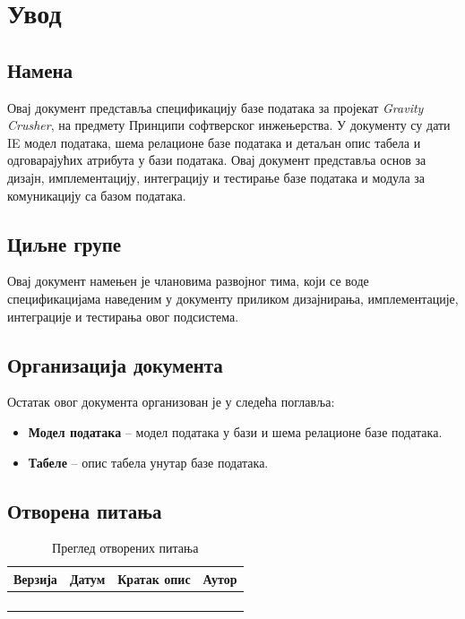 \section{Увод}

\subsection{Намена}
Овај документ представља спецификацију базе података за пројекат \textit{Gravity
Crusher}, на предмету Принципи софтверског инжењерства. У документу су дати IE модел
података, шема релационе базе података и детаљан опис табела и одговарајућих атрибута у
бази података. Овај документ представља основ за дизајн, имплементацију, интеграцију и
тестирање базе података и модула за комуникацију са базом података.

\subsection{Циљне групе}
Овај документ намењен је члановима развојног тима, који се воде спецификацијама наведеним
у документу приликом дизајнирања, имплементације, интеграције и тестирања овог
подсистема.

\subsection{Организација документа}
Остатак овог документа организован је у следећа поглавља:
    \begin{itemize}
        \item \textbf{Модел података} -- модел података у бази и шема релационе базе
                     података.
        \item \textbf{Табеле} -- опис табела унутар базе података.
    \end{itemize}

\subsection{Отворена питања}

\begin{table}[h!]
\centering

    \begin{tabu}{ || X[l] | X[l] | X[l] | X[l] || }
    \hline
    \textbf{Верзија} & \textbf{Датум} & \textbf{Кратак опис} & \textbf{Аутор} \\
    \hline
    \hline
    & & &\\
    \hline
    & & &\\
    \hline
    & & &\\
    \hline
    & & &\\
    \hline
    \end{tabu}
    \caption{Преглед отворених питања}
    \label{table:2}

\end{table}





